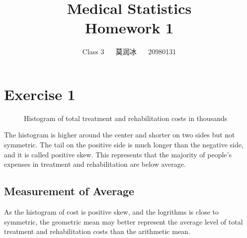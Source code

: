 \documentclass[11pt,a4paper,onside,UTF8]{article}
\title{\blue Medical Statistics \\
\blueb Homework 1}
\author{Class 3 ~~ 莫润冰 ~~ 20980131}
\date{}
\begin{document}
\maketitle

\renewcommand{\thefootnote}{\fnsymbol{footnote}}

\section{Exercise 1}

\begin{figure}[H]
	\centering
	\caption{Histogram of total treatment and rehabilitation costs in thousands}
\end{figure}
The histogram is higher around the center and shorter on two sides but not symmetric.
The tail on the positive side is much longer than the negative side, and it is called positive skew. 
This represents that the majority of people's expenses in treatment and rehabilitation are below average.

\subsection{Measurement of Average}
As the histogram of cost is positive skew, and the logrithms is close to symmetric, the geometric mean may better represent the average level of total treatment and rehabilitation costs than the arithmetic mean.
\end{document}
